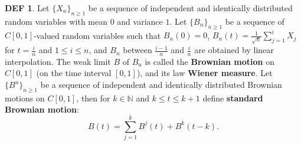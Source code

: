 \documentclass[hidelinks,11pt]{article}
\theoremstyle{definition}
\newtheorem*{defin}{DEF}
\theoremstyle{dotless}
\theoremstyle{remark}
\DeclareMathOperator{\1}{\mathbf{1}}
\begin{document}
\begin{defin}
Let $\{X_n\}_{n\geq1}$ be a sequence of independent and identically distributed random variables with mean $0$ and variance $1$. Let $\{B_n\}_{n\geq1}$ be a sequence of $C[0,1]$-valued random variables such that $B_n(0)=0$, $B_n(t)=\frac{1}{\sqrt{n}}\sum_{j=1}^iX_j$ for $t=\frac{i}{n}$ and $1\leq i\leq n$, and $B_n$ between $\frac{i-1}{n}$ and $\frac{i}{n}$ are obtained by linear interpolation. The weak limit $B$ of $B_n$ is called the \textbf{Brownian motion} on $C[0,1]$ (on the time interval $[0,1]$), and its law \textbf{Wiener measure}.\medbreak
Let $\{B^n\}_{n\geq1}$ be a sequence of independent and identically distributed Brownian motions on $C[0,1]$, then for $k\in\mathbb{N}$ and $k\leq t\leq k+1$ define \textbf{standard Brownian motion}:
\[B(t)=\sum_{j=1}^kB^j(t)+B^k(t-k).\]
\end{defin}
\end{document}
